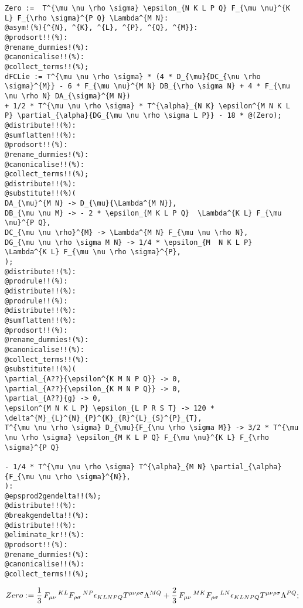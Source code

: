 \documentclass[11pt]{article}
\def\specialcolon{\mathrel{\mathop{:}}\hspace{-.5em}}
\begin{document}
{\color[named]{Blue}\begin{verbatim}
Zero :=  T^{\mu \nu \rho \sigma} \epsilon_{N K L P Q} F_{\mu \nu}^{K L} F_{\rho \sigma}^{P Q} \Lambda^{M N}:
@asym!(%){^{N}, ^{K}, ^{L}, ^{P}, ^{Q}, ^{M}}:
@prodsort!!(%):
@rename_dummies!(%):
@canonicalise!!(%):
@collect_terms!!(%);
dFCLie := T^{\mu \nu \rho \sigma} * (4 * D_{\mu}{DC_{\nu \rho \sigma}^{M}} - 6 * F_{\mu \nu}^{M N} DB_{\rho \sigma N} + 4 * F_{\mu \nu \rho N} DA_{\sigma}^{M N})
+ 1/2 * T^{\mu \nu \rho \sigma} * T^{\alpha}_{N K} \epsilon^{M N K L P} \partial_{\alpha}{DG_{\mu \nu \rho \sigma L P}} - 18 * @(Zero);
@distribute!!(%):
@sumflatten!!(%):
@prodsort!!(%):
@rename_dummies!(%):
@canonicalise!!(%):
@collect_terms!!(%);
@distribute!!(%):
@substitute!!(%)(
DA_{\mu}^{M N} -> D_{\mu}{\Lambda^{M N}},
DB_{\mu \nu M} -> - 2 * \epsilon_{M K L P Q}  \Lambda^{K L} F_{\mu \nu}^{P Q},
DC_{\mu \nu \rho}^{M} -> \Lambda^{M N} F_{\mu \nu \rho N},
DG_{\mu \nu \rho \sigma M N} -> 1/4 * \epsilon_{M  N K L P}  \Lambda^{K L} F_{\mu \nu \rho \sigma}^{P},
);
@distribute!!(%):
@prodrule!!(%):
@distribute!!(%):
@prodrule!!(%):
@distribute!!(%):
@sumflatten!!(%):
@prodsort!!(%):
@rename_dummies!(%):
@canonicalise!!(%):
@collect_terms!!(%):
@substitute!!(%)(
\partial_{A??}{\epsilon^{K M N P Q}} -> 0,
\partial_{A??}{\epsilon_{K M N P Q}} -> 0,
\partial_{A??}{g} -> 0,
\epsilon^{M N K L P} \epsilon_{L P R S T} -> 120 * \delta^{M}_{L}^{N}_{P}^{K}_{R}^{L}_{S}^{P}_{T},
T^{\mu \nu \rho \sigma} D_{\mu}{F_{\nu \rho \sigma M}} -> 3/2 * T^{\mu \nu \rho \sigma} \epsilon_{M K L P Q} F_{\mu \nu}^{K L} F_{\rho \sigma}^{P Q} 
                                                                                                  - 1/4 * T^{\mu \nu \rho \sigma} T^{\alpha}_{M N} \partial_{\alpha}{F_{\mu \nu \rho \sigma}^{N}},
):
@epsprod2gendelta!!(%);
@distribute!!(%):
@breakgendelta!!(%):
@distribute!!(%):
@eliminate_kr!!(%):
@prodsort!!(%):
@rename_dummies!(%):
@canonicalise!!(%):
@collect_terms!!(%);
\end{verbatim}}
\begin{dmath*}[compact, spread=2pt]
Zero\specialcolon{}= \frac{1}{3}\, {F}_{\mu \nu}\,^{K L} {F}_{\rho \sigma}\,^{N P} {\epsilon}_{K L N P Q} {T}^{\mu \nu \rho \sigma} {\Lambda}^{M Q} + \frac{2}{3}\, {F}_{\mu \nu}\,^{M K} {F}_{\rho \sigma}\,^{L N} {\epsilon}_{K L N P Q} {T}^{\mu \nu \rho \sigma} {\Lambda}^{P Q};
\end{dmath*}
\end{document}
